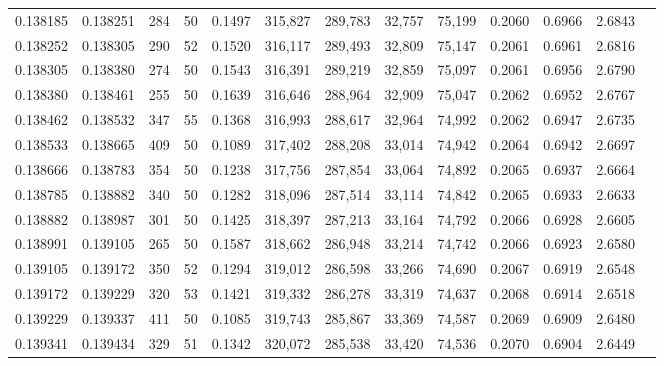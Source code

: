 \begin{tabular}{rrrrrrrrrrrrr}
0.138185 & 0.138251 &   284 &  50 &                                     0.1497 & 315,827 & 289,783 &  32,757 &  75,199 & 0.2060 & 0.6966 & 2.6843 \\
0.138252 & 0.138305 &   290 &  52 &                                     0.1520 & 316,117 & 289,493 &  32,809 &  75,147 & 0.2061 & 0.6961 & 2.6816 \\
0.138305 & 0.138380 &   274 &  50 &                                     0.1543 & 316,391 & 289,219 &  32,859 &  75,097 & 0.2061 & 0.6956 & 2.6790 \\
0.138380 & 0.138461 &   255 &  50 &                                     0.1639 & 316,646 & 288,964 &  32,909 &  75,047 & 0.2062 & 0.6952 & 2.6767 \\
0.138462 & 0.138532 &   347 &  55 &                                     0.1368 & 316,993 & 288,617 &  32,964 &  74,992 & 0.2062 & 0.6947 & 2.6735 \\
0.138533 & 0.138665 &   409 &  50 &                                     0.1089 & 317,402 & 288,208 &  33,014 &  74,942 & 0.2064 & 0.6942 & 2.6697 \\
0.138666 & 0.138783 &   354 &  50 &                                     0.1238 & 317,756 & 287,854 &  33,064 &  74,892 & 0.2065 & 0.6937 & 2.6664 \\
0.138785 & 0.138882 &   340 &  50 &                                     0.1282 & 318,096 & 287,514 &  33,114 &  74,842 & 0.2065 & 0.6933 & 2.6633 \\
0.138882 & 0.138987 &   301 &  50 &                                     0.1425 & 318,397 & 287,213 &  33,164 &  74,792 & 0.2066 & 0.6928 & 2.6605 \\
0.138991 & 0.139105 &   265 &  50 &                                     0.1587 & 318,662 & 286,948 &  33,214 &  74,742 & 0.2066 & 0.6923 & 2.6580 \\
0.139105 & 0.139172 &   350 &  52 &                                     0.1294 & 319,012 & 286,598 &  33,266 &  74,690 & 0.2067 & 0.6919 & 2.6548 \\
0.139172 & 0.139229 &   320 &  53 &                                     0.1421 & 319,332 & 286,278 &  33,319 &  74,637 & 0.2068 & 0.6914 & 2.6518 \\
0.139229 & 0.139337 &   411 &  50 &                                     0.1085 & 319,743 & 285,867 &  33,369 &  74,587 & 0.2069 & 0.6909 & 2.6480 \\
0.139341 & 0.139434 &   329 &  51 &                                     0.1342 & 320,072 & 285,538 &  33,420 &  74,536 & 0.2070 & 0.6904 & 2.6449 \\

\end{tabular}

